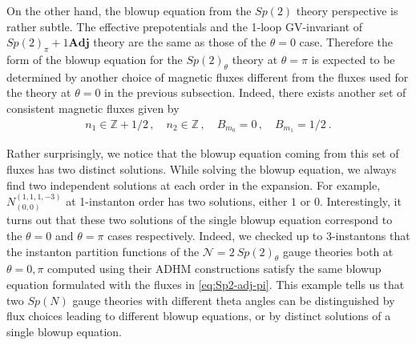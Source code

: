 On the other hand, the blowup equation from the $Sp(2)$ theory perspective is rather subtle. The effective prepotentials and the 1-loop GV-invariant of $ Sp(2)_\pi + 1\mathbf{Adj} $ theory are the same as those of the $ \theta = 0 $ case. Therefore the form of the blowup equation for the $Sp(2)_\theta$ theory at $\theta=\pi$ is expected to be determined by another choice of magnetic fluxes different from the fluxes used for the theory at $\theta=0$ in the previous subsection. Indeed, there exists another set of consistent magnetic fluxes given by
\begin{align}\label{eq:Sp2-adj-pi}
n_1 \in \mathbb{Z} + 1/2 \, , \quad
n_2 \in \mathbb{Z} \, , \quad
B_{m_0} = 0 \, , \quad
B_{m_1} = 1/2 \ .
\end{align}

Rather surprisingly, we notice that the blowup equation coming from this set of fluxes has two distinct solutions. While solving the blowup equation, we always find two independent solutions at each order in the expansion. For example, $ N_{(0, 0)}^{(1, 1, 1, -3)} $ at 1-instanton order has two solutions, either $1$ or $0$. Interestingly, it turns out that these two solutions of the single blowup equation correspond to the $\theta=0$ and $\theta=\pi$ cases respectively. Indeed, we checked up to 3-instantons that the instanton partition functions of the $\mathcal{N}=2\ Sp(2)_\theta$ gauge theories both at $\theta=0,\pi$ computed using their ADHM constructions satisfy the same blowup equation formulated with the fluxes in \eqref{eq:Sp2-adj-pi}. This example tells us that two $Sp(N)$ gauge theories with different theta angles can be distinguished by flux choices leading to different blowup equations, or by distinct solutions of a single blowup equation.

